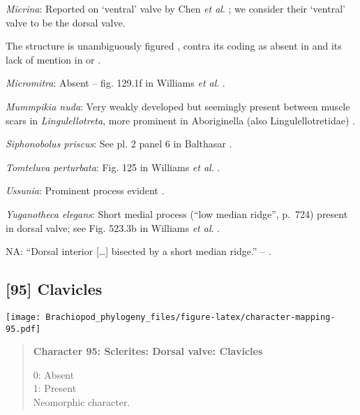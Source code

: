 \documentclass[openany]{book}
\theoremstyle{definition}
\theoremstyle{definition}
\theoremstyle{definition}
\theoremstyle{remark}
\begin{document}
\hypertarget{Micrina-coding-94}{}
\emph{Micrina}: Reported on `ventral' valve by Chen \emph{et al}.
\citeyearpar{Chen2007Reinterpretationof}; we consider their `ventral'
valve to be the dorsal valve.

The structure is unambiguously figured \citep[e.g.~fig. 5.1
in][]{Chen2007Reinterpretationof}, contra its coding as absent in
\citet{Williams2000LinguliformeaCraniiformea} and its lack of mention in
\citet{Williams2007Supplement} or \citet{Zhang2009Architectureand}.

\hypertarget{Micromitra-coding-94}{}
\emph{Micromitra}: Absent -- fig. 129.1f in Williams \emph{et al}.
\citeyearpar{Williams2000LinguliformeaCraniiformea}.

\hypertarget{Mummpikia_nuda-coding-94}{}
\emph{Mummpikia nuda}: Very weakly developed but seemingly present
between muscle scars in \emph{Lingulellotreta}, more prominent in
Aboriginella (also Lingulellotretidae) \citep[fig.
34]{Williams2000LinguliformeaCraniiformea}.

\hypertarget{Siphonobolus_priscus-coding-94}{}
\emph{Siphonobolus priscus}: See pl. 2 panel 6 in Balthasar
\citeyearpar{Balthasar2008iMummpikia}.

\hypertarget{Tomteluva_perturbata-coding-94}{}
\emph{Tomteluva perturbata}: Fig. 125 in Williams \emph{et al}.
\citeyearpar{Williams2000LinguliformeaCraniiformea}.

\hypertarget{Ussunia-coding-94}{}
\emph{Ussunia}: Prominent process evident
\citep{Topper2013Reappraisalof}.

\hypertarget{Yuganotheca_elegans-coding-94}{}
\emph{Yuganotheca elegans}: Short medial process (``low median ridge'',
p.~724) present in dorsal valve; see Fig. 523.3b in Williams \emph{et
al}. \citeyearpar{Williams2000LinguliformeaCraniiformea}.

\hypertarget{NA-coding-94}{}
NA: ``Dorsal interior {[}\ldots{}{]} bisected by a short median ridge.''
-- \citet{Popov2009Earlyontogeny}.

\subsection*{{[}95{]} Clavicles}\label{clavicles}

\texttt{[image: Brachiopod\_phylogeny\_files/figure-latex/character-mapping-95.pdf]}

\begin{quote}
\textbf{Character 95: Sclerites: Dorsal valve: Clavicles}

0: Absent\\
1: Present\\
Neomorphic character.
\end{quote}
\end{document}
